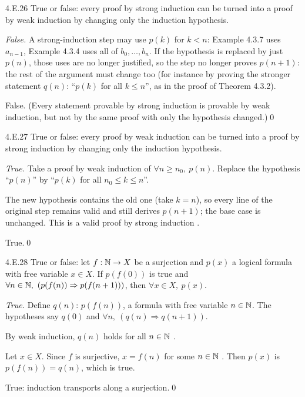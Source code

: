\begin{bookex}[essential]{4.E.26}
True or false: every proof by strong induction can be turned into a proof by weak induction by changing only the induction hypothesis.
\solution
\begin{steps}
\item \emph{False.} A strong-induction step may use $p(k)$ for $k<n$: Example 4.3.7 uses $a_{n-1}$, Example 4.3.4 uses all of $b_0,\dots,b_n$. If the hypothesis is replaced by just $p(n)$, those uses are no longer justified, so the step no longer proves $p(n+1)$: the rest of the argument must change too (for instance by proving the stronger statement $q(n)$: ``$p(k)$ for all $k\le n$'', as in the proof of Theorem 4.3.2).
\end{steps}
\conclusion False. (Every statement provable by strong induction is provable by weak induction, but not by the same proof with only the hypothesis changed.)\qed
\end{bookex}

\begin{bookex}[essential]{4.E.27}
True or false: every proof by weak induction can be turned into a proof by strong induction by changing only the induction hypothesis.
\solution
\begin{steps}
\item \emph{True.} Take a proof by weak induction of $\forall n\ge n_0,\ p(n)$. Replace the hypothesis ``$p(n)$'' by ``$p(k)$ for all $n_0\le k\le n$''.
\item The new hypothesis contains the old one (take $k=n$), so every line of the original step remains valid and still derives $p(n+1)$; the base case is unchanged. This is a valid proof by strong induction .
\end{steps}
\conclusion True.\qed
\end{bookex}

\begin{bookex}[recommended]{4.E.28}
True or false: let $f:\mathbb{N}\to X$ be a surjection and $p(x)$ a logical formula with free variable $x\in X$. If $p(f(0))$ is true and $\forall n\in\N,\ (p(f(n))\Rightarrow p(f(n+1)))$, then $\forall x\in X,\ p(x)$.
\solution
\begin{steps}
\item \emph{True.} Define $q(n)$: $p(f(n))$, a formula with free variable $n\in\mathbb{N}$. The hypotheses say $q(0)$ and $\forall n,\ (q(n)\Rightarrow q(n+1))$.
\item By weak induction, $q(n)$ holds for all $n\in\mathbb{N}$ .
\item Let $x\in X$. Since $f$ is surjective, $x=f(n)$ for some $n\in\mathbb{N}$ . Then $p(x)$ is $p(f(n))=q(n)$, which is true.
\end{steps}
\conclusion True: induction transports along a surjection.\qed
\end{bookex}

